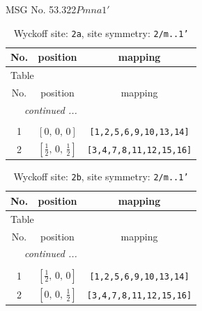 \documentclass[fleqn,8pt]{jsarticle}
\begin{document}
\setcounter{MaxMatrixCols}{32}

\renewcommand{\tablename}{Table~}
\renewcommand{\figurename}{Figure~}
\begin{center}
\LARGE
MSG No. 53.322\quad$Pmna1'$
\end{center}
\renewcommand{\arraystretch}{1.2}
\begin{longtable}{ccc}
\caption{Wyckoff site: {\tt 2a}, site symmetry: {\tt 2/m..1'}}
 \\
 \hline \hline
No. & position & mapping \\ \hline \endfirsthead

\multicolumn{2}{l}{\tablename\ \thetable{}} \\
 \hline \hline
No. & position & mapping \\ \hline \endhead

 \hline \hline
\multicolumn{2}{r}{\footnotesize\it continued ...} \\ \endfoot

 \hline \hline
\multicolumn{2}{r}{} \\ \endlastfoot

1 & $\left[ 0,\, 0,\, 0 \right]$ & {\tt [1,2,5,6,9,10,13,14]} \\ \hline
2 & $\left[ \frac{1}{2},\, 0,\, \frac{1}{2} \right]$ & {\tt [3,4,7,8,11,12,15,16]} \\
\end{longtable}
\renewcommand{\arraystretch}{1.2}
\begin{longtable}{ccc}
\caption{Wyckoff site: {\tt 2b}, site symmetry: {\tt 2/m..1'}}
 \\
 \hline \hline
No. & position & mapping \\ \hline \endfirsthead

\multicolumn{2}{l}{\tablename\ \thetable{}} \\
 \hline \hline
No. & position & mapping \\ \hline \endhead

 \hline \hline
\multicolumn{2}{r}{\footnotesize\it continued ...} \\ \endfoot

 \hline \hline
\multicolumn{2}{r}{} \\ \endlastfoot

1 & $\left[ \frac{1}{2},\, 0,\, 0 \right]$ & {\tt [1,2,5,6,9,10,13,14]} \\ \hline
2 & $\left[ 0,\, 0,\, \frac{1}{2} \right]$ & {\tt [3,4,7,8,11,12,15,16]} \\
\end{longtable}
\end{document}
